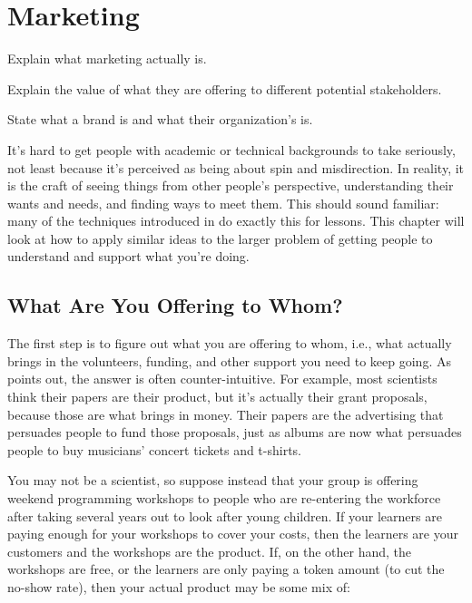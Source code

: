 \chapter{Marketing}\label{s:marketing}

\begin{objectives}

\item Explain what marketing actually is.

\item Explain the value of what they are offering to different
  potential stakeholders.

\item State what a brand is and what their organization's is.

\end{objectives}

It's hard to get people with academic or technical backgrounds to take
 seriously, not least because it's
perceived as being about spin and misdirection. In reality, it is the
craft of seeing things from other people's perspective, understanding
their wants and needs, and finding ways to meet them. This should
sound familiar: many of the techniques introduced in
 do exactly this for lessons. This chapter will
look at how to apply similar ideas to the larger problem of getting
people to understand and support what you're doing.

\section{What Are You Offering to Whom?}\label{s:marketing-what-whom}

The first step is to figure out what you are offering to whom, i.e.,
what actually brings in the volunteers, funding, and other support you
need to keep going.  As \cite{Kuch2011} points out, the answer is
often counter-intuitive. For example, most scientists think their
papers are their product, but it's actually their grant proposals,
because those are what brings in money. Their papers are the
advertising that persuades people to fund those proposals, just as
albums are now what persuades people to buy musicians' concert tickets
and t-shirts.

You may not be a scientist, so suppose instead that your group is
offering weekend programming workshops to people who are re-entering
the workforce after taking several years out to look after young
children.  If your learners are paying enough for your workshops to
cover your costs, then the learners are your customers and the
workshops are the product. If, on the other hand, the workshops are
free, or the learners are only paying a token amount (to cut the
no-show rate), then your actual product may be some mix of:

